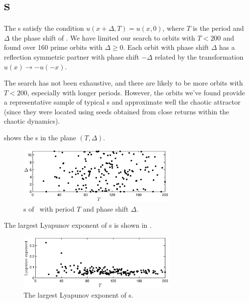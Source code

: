 %

\section{\Rpo s}

The \rpo s satisfy the condition $u(x+\Delta,T) = u(x,0)$, where $T$
is the period and $\Delta$ the phase shift of \rpo .  We have
limited our search to orbits with $T < 200$ and found over 160 prime
orbits with $\Delta \ge 0$.  Each orbit with phase shift $\Delta$
has a reflection symmetric partner with phase shift $-\Delta$
related by the transformation $u(x) \to -u(-x)$.

The search has not been exhaustive, and there are likely to be more
orbits with $T < 200$, especially with longer periods.  However, the
orbits we've found provide a representative sample of typical \rpo s
and approximate well the chaotic attractor (since they were located
using seeds obtained from close returns within the chaotic
dynamics).

 shows the \rpo s in the plane $(T,\Delta)$.
\begin{figure}[t] \label{f:ks22rposT}
\begin{center}
\includegraphics[width=0.7\textwidth]{figs/ks22_rpos_Tdelta.eps}
\end{center}
\caption{\Rpo s of \KSe\ with period $T$ and phase shift $\Delta$.
        }
\end{figure}

The largest Lyapunov exponent of \rpo s is shown in
.

\begin{figure}[t] \label{f:ks22rposL}
\begin{center}
\includegraphics[width=0.7\textwidth]{figs/ks22_rpos_lyap.eps}
\end{center}
\caption{The largest Lyapunov exponent of \rpo s.
        }
\end{figure}

